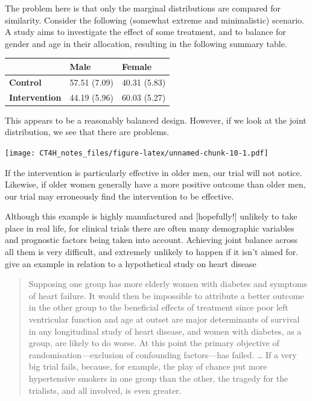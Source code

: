 \documentclass[
  openany]{book}
\theoremstyle{definition}
\theoremstyle{definition}
\theoremstyle{definition}
\theoremstyle{definition}
\theoremstyle{remark}
\begin{document}
The problem here is that only the marginal distributions are compared for similarity. Consider the following (somewhat extreme and minimalistic) scenario. A study aims to investigate the effect of some treatment, and to balance for gender and age in their allocation, resulting in the following summary table.

\begin{tabular}{>{}l|l|l}
\hline
  & Male & Female\\
\hline
\textbf{Control} & 57.51 (7.09) & 40.31 (5.83)\\
\hline
\textbf{Intervention} & 44.19 (5.96) & 60.03 (5.27)\\
\hline
\end{tabular}

This appears to be a reasonably balanced design. However, if we look at the joint distribution, we see that there are problems.

\texttt{[image: CT4H\_notes\_files/figure-latex/unnamed-chunk-10-1.pdf]}

If the intervention is particularly effective in older men, our trial will not notice. Likewise, if older women generally have a more positive outcome than older men, our trial may erroneously find the intervention to be effective.

Although this example is highly manufactured and {[}hopefully!{]} unlikely to take place in real life, for clinical trials there are often many demographic variables and prognostic factors being taken into account. Achieving joint balance across all them is very difficult, and extremely unlikely to happen if it isn't aimed for. \citet{treasure1998minimisation} give an example in relation to a hypothetical study on heart disease

\begin{quote}
Supposing one group has more elderly women with diabetes and symptoms of heart failure. It would then be impossible to attribute a better outcome in the other group to the beneficial effects of treatment since poor left ventricular function and age at outset are major determinants of survival in any longitudinal study of heart disease, and women with diabetes, as a group, are likely to do worse. At this point the primary objective of randomisation---exclusion of confounding factors---has failed. \ldots{} If a very big trial fails, because, for example, the play of chance put more hypertensive smokers in one group than the other, the tragedy for the trialists, and all involved, is even greater.
\end{quote}
\end{document}

